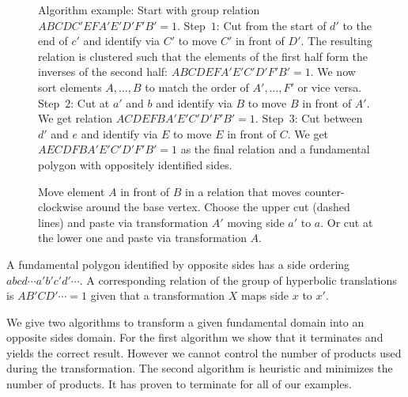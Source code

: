 \documentclass[Thesis.tex]{subfiles}
\begin{document}
  \begin{figure}
  \caption{Algorithm example: Start with group relation $ABCDC' EFA'E'D'F'B' = 1$. Step~$1$: Cut from the start of $d'$ to the end of $c'$ and identify via $C'$ to move $C'$ in front of $D'$. The resulting relation is clustered such that the elements of the first half form the inverses of the second half: $ABCDEFA'E'C'D'F'B' = 1$. We now sort elements $A,\ldots,B$ to match the order of $A',\ldots,F'$ or vice versa. Step~$2$: Cut at $a'$ and $b$ and identify via $B$ to move $B$ in front of $A'$. We get relation $ACDEFBA'E'C'D'F'B' = 1$. Step~$3$: Cut between $d'$ and $e$ and identify via $E$ to move $E$ in front of $C$. We get $AECDFBA'E'C'D'F'B' = 1$ as the final relation and a fundamental polygon with oppositely identified sides.}
  \label{fig:opposite_algorithm}
  \end{figure}

  \begin{figure}
  \centering
  \resizebox{0.3\textwidth}{!} {
  
  }
  \caption{Move element $A$ in front of $B$ in a relation that moves counter-clockwise around the base vertex. Choose the upper cut (dashed lines) and paste via transformation $A'$ moving side $a'$ to $a$. Or cut at the lower one and paste via transformation $A$.}
  \label{fig:cut-and-paste-motion}
  \end{figure}

  A fundamental polygon identified by opposite sides has a side ordering $abcd\cdots a'b'c'd'\cdots$. A corresponding relation of the group of hyperbolic translations is $AB'CD'\cdots=1$ given that a transformation $X$ maps side $x$ to $x'$.

  We give two algorithms to transform a given fundamental domain into an opposite sides domain.
  For the first algorithm we show that it terminates and yields the correct result. However we cannot control the number of products used during the transformation. The second algorithm is heuristic and minimizes the number of products. It has proven to terminate for all of our examples.
\end{document}
